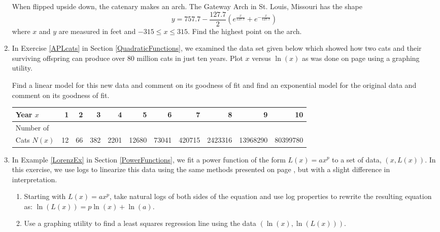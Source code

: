 \documentclass{ximera}
\begin{document}
\begin{enumerate}
When flipped upside down, the catenary makes an arch.  The Gateway Arch in St. Louis, Missouri has the shape \[y = 757.7 - \frac{127.7}{2}\left(e^{\frac{x}{127.7}} + e^{-\frac{x}{127.7}}\right)\] where $x$ and $y$ are measured in feet and $-315 \leq x \leq 315$.  Find the highest point on the arch.

\item \label{APLcatsrevisited} In Exercise \ref{APLcats} in Section \ref{QuadraticFunctions}, we examined the data set given below which showed how two cats and their surviving offspring can produce over 80 million cats in just ten years. Plot $x$ versus $\ln(x)$ as was done on page \pageref{swineflulinearized} using a graphing utility.  

Find a linear model for this new data and comment on its goodness of fit and  find an exponential model for the original data and comment on its goodness of fit.

\medskip

\small

\noindent \begin{tabular}{|l|r|r|r|r|r|r|r|r|r|r|} \hline
Year $x$ & 1 & 2 & 3 & 4 & 5 & 6 & 7 & 8 & 9 & 10 \\ 
\hline 
Number of  & & & & & & & & & & \\
Cats $N(x)$ & 12 & 66 & 382 & 2201 & 12680 & 73041 & 420715 & 2423316 & 13968290 & 80399780 \\ \hline
\end{tabular}

\normalsize

\item \label{LorenzExFollowUp} In Example \ref{LorenzEx} in Section \ref{PowerFunctions}, we fit a power function of the form $L(x) = a x^{p}$ to a set of data, $(x, L(x))$.  In this exercise, we use logs to linearize this data using the same methods presented on page \pageref{swineflulinearized}, but with a slight difference in interpretation.

\begin{enumerate}

\item  Starting with $L(x) = a x^{p}$, take natural logs of both sides of the equation and use log properties to rewrite the resulting equation as:  $\ln(L(x)) = p \ln(x) + \ln(a)$.  

\item  Use a graphing utility to find a least squares regression line using the data $(\ln(x), \ln(L(x)))$.   


\end{enumerate}
\end{enumerate}
\end{document}
